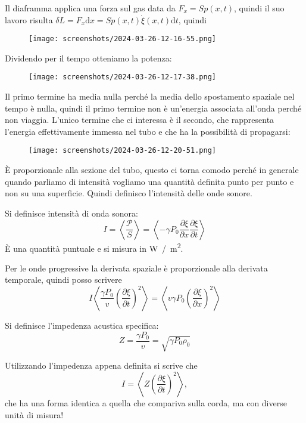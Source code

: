 Il diaframma applica una forza sul gas data da \(F_x = S p(x,t)\), quindi il suo lavoro risulta \(\delta L = F_x \mathrm{d} x = S p(x,t) \dot{\xi }(x,t) \mathrm{d} t\), quindi
\begin{figure}[H]
	\centering
	\texttt{[image: screenshots/2024-03-26-12-16-55.png]}
\end{figure}
Dividendo per il tempo otteniamo la potenza:
\begin{figure}[H]
	\centering
	\texttt{[image: screenshots/2024-03-26-12-17-38.png]}
\end{figure}
Il primo termine ha media nulla perché la media dello spostamento spaziale nel tempo è nulla, quindi il primo termine non è un'energia associata all'onda perché non viaggia. L'unico termine che ci interessa è il secondo, che rappresenta l'energia effettivamente immessa nel tubo e che ha la possibilità di propagarsi:
\begin{figure}[H]
	\centering
	\texttt{[image: screenshots/2024-03-26-12-20-51.png]}
\end{figure} 
È proporzionale alla sezione del tubo, questo ci torna comodo perché in generale quando parliamo di intensità vogliamo una quantità definita punto per punto e non su una superficie. Quindi definisco l'intensità delle onde sonore.
\begin{definition}
	Si definisce intensità di onda sonora:
	\begin{equation}
		I = \left\langle \frac{\mathcal{P} }{S} \right\rangle = \left\langle -\gamma P_0 \frac{\partial \xi }{\partial x} \frac{\partial \xi }{\partial t}  \right\rangle 
	\end{equation}
	È una quantità puntuale e si misura in \unit{W / m^2}.
\end{definition}
Per le onde progressive la derivata spaziale è proporzionale alla derivata temporale, quindi posso scrivere
\begin{equation}
	I \left\langle \frac{\gamma P_0}{v} \left( \frac{\partial \xi }{\partial t}  \right) ^{2}   \right\rangle = \left\langle v \gamma P_0 \left( \frac{\partial \xi }{\partial x}  \right)^{2}   \right\rangle 
\end{equation}
\begin{definition}
	Si definisce l'impedenza acustica specifica:
	\begin{equation}
		Z = \frac{\gamma P_0}{v} = \sqrt{\gamma P_0 \rho _0} 
	\end{equation}
\end{definition}
Utilizzando l'impedenza appena definita si scrive che
\begin{equation}
	I = \left\langle Z \left( \frac{\partial \xi }{\partial t}  \right) ^{2}  \right\rangle,
\end{equation}
che ha una forma identica a quella che compariva sulla corda, ma con diverse unità di misura!
